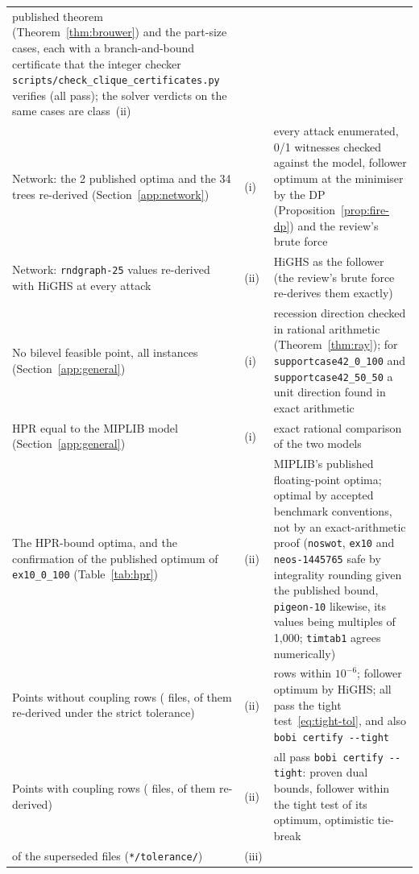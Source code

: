 {\begin{longtable}{@{}>{\raggedright\arraybackslash}p{2.35in}l>{\raggedright\arraybackslash}p{3.0in}@{}}
published theorem (Theorem~\ref{thm:brouwer}) and the \NumCliquePartCases{}
part-size cases, each with a branch-and-bound certificate that the integer checker
\texttt{scripts/check\_clique\_certificates.py} verifies (all pass); the solver
verdicts on the same cases are class~(ii)\\[2pt]
Network: the 2 published optima and the 34 trees re-derived (Section~\ref{app:network}) &
(i) & every attack enumerated, 0/1 witnesses checked against the model,
follower optimum at the minimiser by the DP (Proposition~\ref{prop:fire-dp}) and the
review's brute force\\[2pt]
Network: \NetworkRndSmall{} \texttt{rndgraph-25} values re-derived with HiGHS at every attack & (ii) &
HiGHS as the follower (the review's brute force re-derives them exactly)\\[2pt]
No bilevel feasible point, all \NumRayExact{} instances (Section~\ref{app:general}) & (i) &
recession direction checked in rational arithmetic (Theorem~\ref{thm:ray});
for \texttt{supportcase42\_0\_100} and \texttt{supportcase42\_50\_50} a unit
direction found in exact arithmetic\\[2pt]
HPR equal to the MIPLIB model (Section~\ref{app:general}) & (i) &
exact rational comparison of the two models\\[2pt]
The \NumHprOptimal{} HPR-bound optima, and the confirmation of the published
optimum of \texttt{ex10\_0\_100} (Table~\ref{tab:hpr}) & (ii) & MIPLIB's
published floating-point optima; optimal by accepted benchmark conventions,
not by an exact-arithmetic proof (\texttt{noswot}, \texttt{ex10} and
\texttt{neos-1445765} safe by integrality rounding given the published bound,
\texttt{pigeon-10} likewise, its values being multiples of 1,000;
\texttt{timtab1} agrees numerically)\\[2pt]
Points without coupling rows (\NumGeneralFiles{} files, \NumGeneralTightened{} of them
re-derived under the strict tolerance) & (ii) & rows within $10^{-6}$; follower
optimum by HiGHS; all pass the tight test~\eqref{eq:tight-tol}, and
\NumGeneralTightCertified{} also \texttt{bobi certify -{}-tight}\\[2pt]
Points with coupling rows (\NumCoupledFiles{} files,
\NumCoupledTightened{} of them re-derived) & (ii) & all \SuppCoupledExact{} pass
\texttt{bobi certify -{}-tight}: proven dual bounds, follower within the tight test
of its optimum, optimistic tie-break\\[2pt]
\NumTightSupersededBench{} of the \NumTightSuperseded{} superseded files (\texttt{*/tolerance/}) & (iii) &

\end{longtable}}
